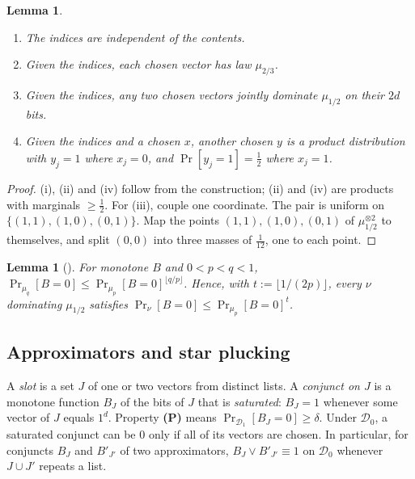 \documentclass[11pt,a4paper]{article}
\theoremstyle{plain}
\newtheorem{lemma}[theorem]{Lemma}
\theoremstyle{definition}
\theoremstyle{remark}
\newcommand{\Dz}{\mathcal{D}_0}
\newcommand{\Do}{\mathcal{D}_1}
\newcommand{\ones}{1^d}
\begin{document}
\begin{lemma}\label{lem:d0}
\begin{enumerate}[label=(\roman*)]
  \item The indices are independent of the contents.
  \item Given the indices, each chosen vector has law $\mu_{2/3}$.
  \item Given the indices, any two chosen vectors jointly dominate $\mu_{1/2}$ on their $2d$ bits.
  \item Given the indices and a chosen $x$, another chosen $y$ is a product distribution with $y_j=1$ where $x_j=0$,
    and $\Pr[y_j=1]=\frac12$ where $x_j=1$.
\end{enumerate}
\end{lemma}
\begin{proof}
(i), (ii) and (iv) follow from the construction; (ii) and (iv) are products with marginals $\ge\frac12$. For (iii),
couple one coordinate. The pair is uniform on $\{(1,1),(1,0),(0,1)\}$. Map the points $(1,1),(1,0),(0,1)$ of
$\mu_{1/2}^{\otimes2}$ to themselves, and split $(0,0)$ into three masses of $\frac1{12}$, one to each point.
\end{proof}

\begin{lemma}[{\cite[Lemma 22]{CLSS26}}]\label{lem:clss}
For monotone $B$ and $0<p<q<1$, $\Pr_{\mu_q}[B=0]\le\Pr_{\mu_p}[B=0]^{\lfloor q/p\rfloor}$. Hence, with
$t:=\lfloor1/(2p)\rfloor$, every $\nu$ dominating $\mu_{1/2}$ satisfies $\Pr_\nu[B=0]\le\Pr_{\mu_p}[B=0]^t$.
\end{lemma}

\subsection{Approximators and star plucking}
A \emph{slot} is a set $J$ of one or two vectors from distinct lists. A \emph{conjunct on $J$} is a monotone function
$B_J$ of the bits of $J$ that is \emph{saturated}: $B_J=1$ whenever some vector of $J$ equals $\ones$. Property
\textbf{(P)} means $\Pr_{\Do}[B_J=0]\ge\delta$. Under $\Dz$, a saturated conjunct can be 0 only if all of its vectors
are chosen. In particular, for conjuncts $B_J$ and $B'_{J'}$ of two approximators, $B_J\vee B'_{J'}\equiv1$ on $\Dz$
whenever $J\cup J'$ repeats a list.
\end{document}
